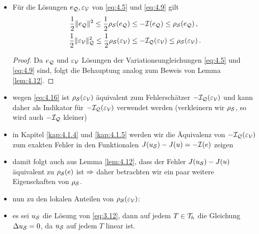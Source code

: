 \begin{itemize}
\item 
\begin{kor}\label{kor:4.14}
Für die Lösungen $e_{\mathcal Q}, \varepsilon_{\mathcal V}$ von \eqref{eq:4.5} und \eqref{eq:4.9} gilt
\begin{align}\label{eq:4.15}
	\frac 12 \lVert e_{\mathcal Q}\rVert^2 \le \frac 12 \rho_{\mathcal S}(e_{\mathcal Q})& \le -\mathcal I (e_{\mathcal Q}) \le \rho_{\mathcal S}(e_{\mathcal Q}) \, ,\\
	\label{eq:4.16}
	\frac 12 \lVert \varepsilon_{\mathcal V}\rVert_{\mathcal Q}^2 \le \frac 12 \rho_{\mathcal S}(\varepsilon_{\mathcal V})& \le -\mathcal I_{\mathcal Q} (\varepsilon_{\mathcal V}) \le \rho_{\mathcal S}(\varepsilon_{\mathcal V})\, .
\end{align}
\end{kor}

\begin{proof}
Da $e_{\mathcal Q}$ und $\varepsilon_{\mathcal V}$ Lösungen der Variationsungleichungen \eqref{eq:4.5} und \eqref{eq:4.9} sind, folgt die Behauptung analog zum Beweis von Lemma \ref{lem:4.12}.
\end{proof}

\item wegen \eqref{eq:4.16} ist $\rho_{\mathcal S} (\varepsilon_{\mathcal V})$ äquivalent zum Fehlerschätzer $-\mathcal I_{\mathcal Q}(\varepsilon_{\mathcal V})$ und kann daher als Indikator für $-\mathcal I_{\mathcal Q} (\varepsilon_{\mathcal V})$ verwendet werden (verkleinern wir $\rho_{\mathcal S}$, so wird auch $-\mathcal I_{\mathcal Q}$ kleiner)

\item in Kapitel \ref{kap:4.1.4} und \ref{kap:4.1.5} werden wir die Äquivalenz von $-\mathcal I_{\mathcal Q}(\varepsilon_{\mathcal V})$ zum exakten Fehler in den Funktionalen $J(u_{\mathcal S}) - J(u)=-\mathcal I(e)$ zeigen

\item damit folgt auch aus Lemma \ref{lem:4.12}, dass der Fehler $J(u_{\mathcal S})-J(u)$ äquivalent zu $\rho_{\mathcal S}(e)$ ist $\Rightarrow$ daher betrachten wir ein paar weitere Eigenschaften von $\rho_{\mathcal S}$.

\item nun zu den lokalen Anteilen von $\rho_{\mathcal S}(\varepsilon_{\mathcal V})$:

\item es sei $u_{\mathcal S}$ die Lösung von \eqref{eq:3.12}, dann auf jedem $T\in \mathcal T_h$ die Gleichung $\Delta u_{\mathcal S} = 0$, da $u_{\mathcal S}$ auf jedem $T$ linear ist.


\end{itemize}

